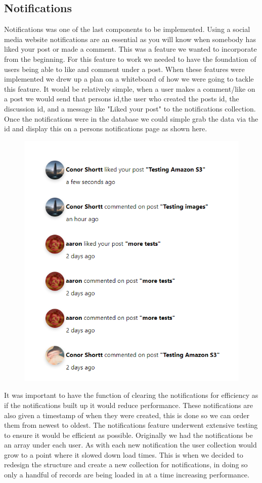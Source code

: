 \subsection{Notifications}
Notifications was one of the last components to be implemented. Using a social media website notifications are an essential as you will know when somebody has liked your post or made a comment. This was a feature we wanted to incorporate from the beginning. 
For this feature to work we needed to have the foundation of users being able to like and comment under a post. When these features were implemented we drew up a plan on a whiteboard of how we were going to tackle this feature. It would be relatively simple, when a user makes a comment/like on a post we would send that persons id,the user who created the posts id, the discussion id, and a message like "Liked your post" to the notifications collection. Once the notifications were in the database we could simple grab the data via the id and display this on a persons notifications page as shown here.
\begin{figure}[H]
  \centering
  \includegraphics[scale=0.55]{img/notifications.PNG}
  \label{fig:Notifications}
\end{figure}
It was important to have the function of clearing the notifications for efficiency as if the notifications built up it would reduce performance. These notifications are also given a timestamp of when they were created, this is done so we can order them from newest to oldest. The notifications feature underwent extensive testing to ensure it would be efficient as possible. Originally we had the notifications be an array under each user. As with each new notification the user collection would grow to a point where it slowed down load times. This is when we decided to redesign the structure and create a new collection for notifications, in doing so only a handful of records are being loaded in at a time increasing performance.

